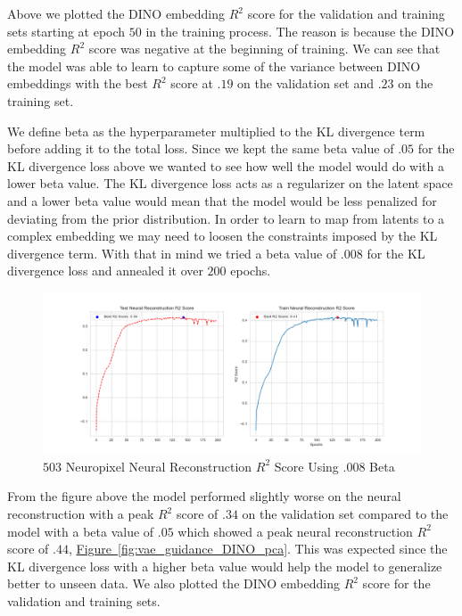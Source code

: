 \documentclass[12pt, letterpaper]{article}
\begin{document}
Above we plotted the DINO \cite{dino} embedding $R^2$ score for the validation and training sets starting at epoch $50$ in the training process. The reason is because the DINO \cite{dino} embedding $R^2$ score was negative at the beginning of training. We can see that the model was able to learn to capture some of the variance between DINO \cite{dino} embeddings with the best $R^2$ score at $.19$ on the validation set and $.23$ on the training set.

We define beta as the hyperparameter multiplied to the KL divergence term before adding it to the total loss. Since we kept the same beta value of $.05$ for the KL divergence loss above we wanted to see how well the model would do with a lower beta value. The KL divergence loss acts as a regularizer on the latent space and a lower beta value would mean that the model would be less penalized for deviating from the prior distribution. In order to learn to map from latents to a complex embedding we may need to loosen the constraints imposed by the KL divergence term. With that in mind we tried a beta value of $.008$ for the KL divergence loss and annealed it over $200$ epochs.

\begin{figure}[H]
    \centering
    \includegraphics[width=1.0\textwidth]{x_r2_128dim_503_top_var_200_epochs_0.008_beta_2_layer_.9_pca_DINO_embed.png}
    \caption{$503$ Neuropixel Neural Reconstruction $R^2$ Score Using .008 Beta}
    \label{fig:vae_guidance_DINO_pca_neural_reconstruction_.008_beta}
\end{figure}

From the figure above the model performed slightly worse on the neural reconstruction with a peak $R^2$ score of $.34$ on the validation set compared to the model with a beta value of $.05$ which showed a peak neural reconstruction $R^2$ score of $.44$, \hyperref[fig:vae_guidance_DINO_pca]{Figure~\ref{fig:vae_guidance_DINO_pca}}. This was expected since the KL divergence loss with a higher beta value would help the model to generalize better to unseen data. We also plotted the DINO \cite{dino} embedding $R^2$ score for the validation and training sets.
\end{document}
